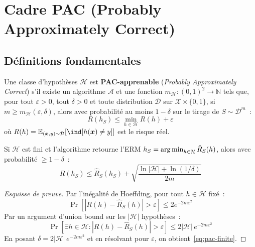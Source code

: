 \section{Cadre PAC (Probably Approximately Correct)}
\label{sec:pac}

\subsection{D\'efinitions fondamentales}

\begin{definition}
\label{def:pac-learning}
Une classe d'hypoth\`eses $\mathcal{H}$ est \textbf{PAC-apprenable}
(\emph{Probably Approximately Correct}) s'il existe un algorithme
$\mathcal{A}$ et une fonction $m_{\mathcal{H}} : (0,1)^2 \to \mathbb{N}$
tels que, pour tout $\varepsilon > 0$, tout $\delta > 0$ et toute
distribution $\mathcal{D}$ sur $\mathcal{X} \times \{0, 1\}$, si
$m \geq m_{\mathcal{H}}(\varepsilon, \delta)$, alors avec probabilit\'e
au moins $1 - \delta$ sur le tirage de $S \sim \mathcal{D}^m$~:
\begin{equation}
  R(h_S) \leq \min_{h \in \mathcal{H}} R(h) + \varepsilon
  \label{eq:pac}
\end{equation}
o\`u $R(h) = \E_{(\bm{x}, y) \sim \mathcal{D}}[\ind[h(\bm{x}) \neq y]]$
est le risque r\'eel.
\end{definition}

\begin{theoreme}
\label{thm:pac-finite}
Si $\mathcal{H}$ est fini et l'algorithme retourne l'ERM
$h_S = \operatorname*{arg\,min}_{h \in \mathcal{H}} \hat{R}_S(h)$, alors avec
probabilit\'e $\geq 1 - \delta$~:
\begin{equation}
  R(h_S) \leq \hat{R}_S(h_S) +
  \sqrt{\frac{\ln|\mathcal{H}| + \ln(1/\delta)}{2m}}
  \label{eq:pac-finite}
\end{equation}
\end{theoreme}

\begin{proof}[Esquisse de preuve]
Par l'in\'egalit\'e de Hoeffding, pour tout $h \in \mathcal{H}$ fix\'e~:
\begin{equation}
  \Pr\!\left[|R(h) - \hat{R}_S(h)| > \varepsilon\right] \leq 2e^{-2m\varepsilon^2}
\end{equation}
Par un argument d'union bound sur les $|\mathcal{H}|$ hypoth\`eses~:
\begin{equation}
  \Pr\!\left[\exists h \in \mathcal{H} : |R(h) - \hat{R}_S(h)| > \varepsilon\right]
  \leq 2|\mathcal{H}|\, e^{-2m\varepsilon^2}
\end{equation}
En posant $\delta = 2|\mathcal{H}|\, e^{-2m\varepsilon^2}$ et en r\'esolvant
pour $\varepsilon$, on obtient~\eqref{eq:pac-finite}.
\end{proof}

